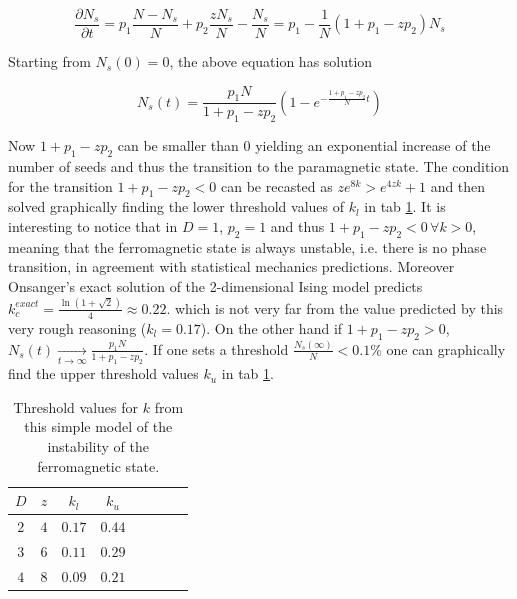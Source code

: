 \documentclass[a4paper, 11pt]{article}
\begin{document}
      \begin{equation*}
        \frac{\partial N_{s}}{\partial t} = p_1\frac{N - N_{s}}{N}  + p_2 \frac{zN_s}{N}- \frac{N_{s}}{N} = p_1 - \frac{1}{N}(1 + p_1 - zp_2) N_s
      \end{equation*}

      Starting from $N_s(0) = 0$, the above equation has solution

      \begin{equation*}
        N_{s}(t) = \frac{p_1N}{1 + p_1 - zp_2}\left(1 - e^{-\frac{1 + p_1 -zp_2}{N}t}  \right)
      \end{equation*}

      Now $1 + p_1 - zp_2$ can be smaller than 0 yielding an exponential increase of the number of seeds and thus the transition to the paramagnetic state. The condition for the transition $1 + p_1 - zp_2 < 0$ can be recasted as $ze^{8k} > e^{4zk} + 1$ and then solved graphically finding the lower threshold values of $k_l$ in tab \ref{tab:k_crit_th}.
      It is interesting to notice that in $D = 1$, $p_2 = 1$ and thus $1 + p_1 - zp_2 < 0 \, \forall k > 0$, meaning that the ferromagnetic state is always unstable, i.e. there is no phase transition, in agreement with statistical mechanics predictions. Moreover Onsanger's exact solution of the 2-dimensional Ising model predicts $k_{c}^{exact} = \frac{\ln(1 + \sqrt{2})}{4} \approx 0.22$. which is not very far from the value predicted by this very rough reasoning ($k_l = 0.17$).
      On the other hand if $1 + p_1 - zp_2 > 0$, $N_s(t) \xrightarrow[t \to \infty]{} \frac{p_1N}{1 + p_1 - zp_2}$.
      If one sets a threshold $\frac{N_s(\infty)}{N} < 0.1\%$ one can graphically find the upper threshold values $k_u$ in tab \ref{tab:k_crit_th}.

      \begin{table}[H]
        \centering
        \begin{tabular}{cccccccc}
          \toprule
          $D$ & $z$ & $k_l$ & $k_u$ \\
          \midrule
          $2$ & $4$ & $0.17$ & $0.44$ \\
          $3$ & $6$ & $0.11$ & $0.29$ \\
          $4$ & $8$ & $0.09$ & $0.21$ \\
          \bottomrule
        \end{tabular}
        \caption{Threshold values for $k$ from this simple model of the instability of the ferromagnetic state.}
        \label{tab:k_crit_th}
      \end{table}
\end{document}
